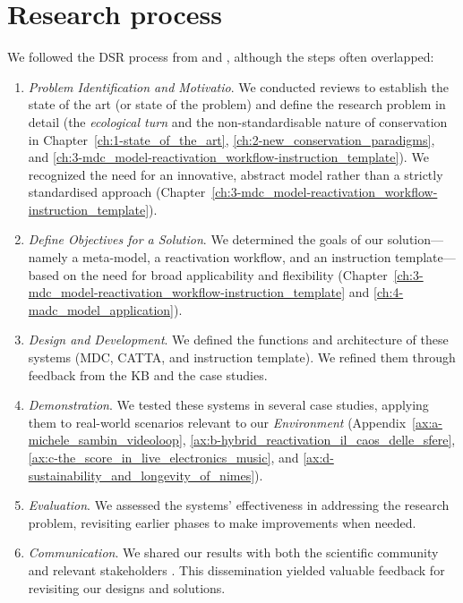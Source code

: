 \section{Research process}
We followed the DSR process from \cite{peffers2007design} and \cite{brocke2020introduction}, although the steps often overlapped:
\begin{enumerate}
    \item \textit{Problem Identification and Motivatio}. We conducted reviews to establish the state of the art (or state of the problem) and define the research problem in detail (the \textit{ecological turn} and the non-standardisable nature of conservation in Chapter~\ref{ch:1-state_of_the_art}, \ref{ch:2-new_conservation_paradigms}, and \ref{ch:3-mdc_model-reactivation_workflow-instruction_template}). We recognized the need for an innovative, abstract model rather than a strictly standardised approach (Chapter~\ref{ch:3-mdc_model-reactivation_workflow-instruction_template}).
    \item \textit{Define Objectives for a Solution}. We determined the goals of our solution—namely a meta-model, a reactivation workflow, and an instruction template—based on the need for broad applicability and flexibility (Chapter~\ref{ch:3-mdc_model-reactivation_workflow-instruction_template} and \ref{ch:4-madc_model_application}).
    \item \textit{Design and Development}. We defined the functions and architecture of these systems (MDC, CATTA, and instruction template). We refined them through feedback from the KB and the case studies.
    \item \textit{Demonstration}. We tested these systems in several case studies, applying them to real-world scenarios relevant to our \textit{Environment} (Appendix~\ref{ax:a-michele_sambin_videoloop}, \ref{ax:b-hybrid_reactivation_il_caos_delle_sfere}, \ref{ax:c-the_score_in_live_electronics_music}, and \ref{ax:d-sustainability_and_longevity_of_nimes}).
    \item \textit{Evaluation}. We assessed the systems’ effectiveness in addressing the research problem, revisiting earlier phases to make improvements when needed.
    \item \textit{Communication}. We shared our results with both the scientific community and relevant stakeholders \cite{fiordelmondo2023multilevel, fiordelmondo2023toward, fiordelmondo2024nime, fiordelmondo2024reactivating}. This dissemination yielded valuable feedback for revisiting our designs and solutions.
\end{enumerate}

